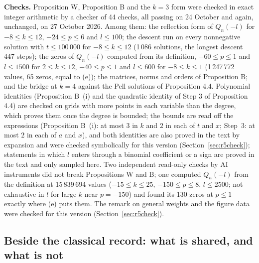\documentclass[11pt]{article}
\begin{document}
\medskip
\noindent\textbf{Checks.} Proposition W, Proposition B and the $k=3$ form were checked in exact integer arithmetic by a checker of 44 checks, all passing on 24 October and again, unchanged, on 27 October 2026. Among them: the reflection form of $Q_n(-l)$ for $-8\le k\le12$, $-24\le p\le6$ and $l\le100$; the descent run on every nonnegative solution with $t\le100\,000$ for $-8\le k\le12$ (1\,086 solutions, the longest descent 447 steps); the zeros of $Q_n(-l)$ computed from its definition, $-60\le p\le1$ and $l\le1500$ for $2\le k\le12$, $-40\le p\le1$ and $l\le600$ for $-8\le k\le1$ (1\,247\,772 values, 65 zeros, equal to (e)); the matrices, norms and orders of Proposition B; and the bridge at $k=4$ against the Pell solutions of Proposition 4.4. Polynomial identities (Proposition B~(i) and the quadratic identity of Step 3 of Proposition 4.4) are checked on grids with more points in each variable than the degree, which proves them once the degree is bounded; the bounds are read off the expressions (Proposition B~(i): at most $3$ in $k$ and $2$ in each of $t$ and $x$; Step~3: at most $2$ in each of $a$ and $x$), and both identities are also proved in the text by expansion and were checked symbolically for this version (Section~\ref{sec:r5check}); statements in which $l$ enters through a binomial coefficient or a sign are proved in the text and only sampled here. Two independent read-only checks by AI instruments did not break Propositions W and B; one computed $Q_n(-l)$ from the definition at 15\,839\,694 values ($-15\le k\le25$, $-150\le p\le8$, $l\le2500$; not exhaustive in $l$ for large $k$ near $p=-150$) and found its 130 zeros at $p\le1$ exactly where (e) puts them. The remark on general weights and the figure data were checked for this version (Section~\ref{sec:r5check}).

\subsection{Beside the classical record: what is shared, and what is not}\label{sec:classical}
\end{document}
